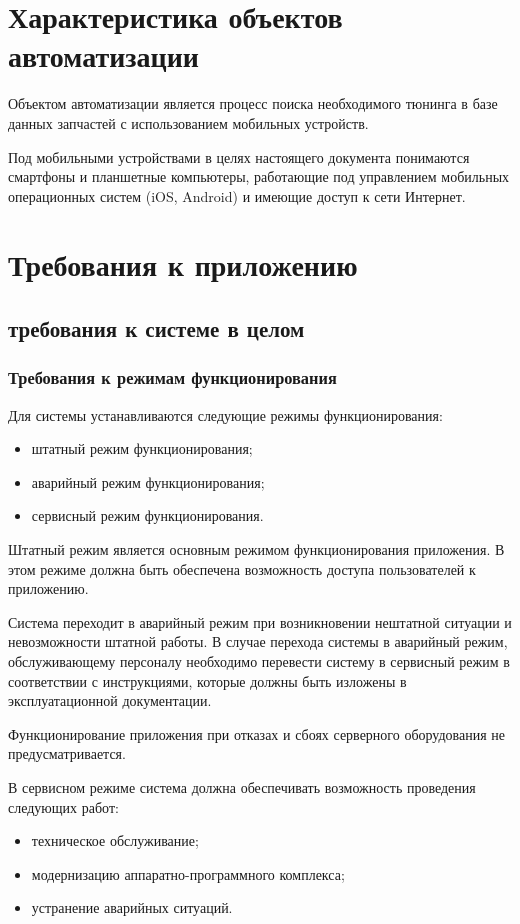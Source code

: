\documentclass[14pt]{extreport}
\begin{document}
\chapter{Характеристика объектов автоматизации}

Объектом автоматизации является процесс поиска необходимого тюнинга в базе данных запчастей с использованием мобильных устройств.

Под мобильными устройствами в целях настоящего документа понимаются смартфоны и планшетные компьютеры, работающие под управлением мобильных операционных систем (iOS, Android) и имеющие доступ к сети Интернет.

\chapter{Требования к приложению}
\section{требования к системе в целом}
\subsection{Требования к режимам функционирования}
Для системы устанавливаются следующие режимы функционирования:
\begin{itemize}
	\item штатный режим функционирования;
	\item аварийный режим функционирования;
	\item сервисный режим функционирования.
\end{itemize}

Штатный режим является основным режимом функционирования приложения. В этом режиме должна быть обеспечена возможность доступа пользователей 
к приложению.

Система переходит в аварийный режим при возникновении нештатной ситуации и невозможности штатной работы. В случае перехода системы в аварийный режим, обслуживающему персоналу необходимо перевести систему в сервисный режим 
в соответствии с инструкциями, которые должны быть изложены в эксплуатационной документации.

Функционирование приложения при отказах и сбоях серверного оборудования не предусматривается.

В сервисном режиме система должна обеспечивать возможность проведения следующих работ:
\begin{itemize}
	\item техническое обслуживание;
	\item модернизацию аппаратно-программного комплекса;
	\item устранение аварийных ситуаций.
\end{itemize}
\end{document}
